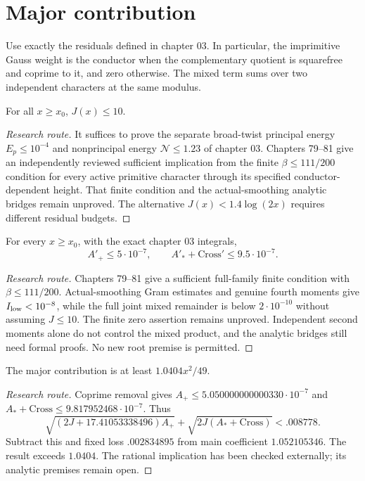 \chapter{Major contribution}
Use exactly the residuals defined in chapter 03. In particular, the
imprimitive Gauss weight is the conductor when the complementary quotient
is squarefree and coprime to it, and zero otherwise. The mixed term sums
over two independent characters at the same modulus.

\begin{theorem}\label{upperj}\notready
For all $x\ge x_0$, $J(x)\le10$.
\end{theorem}
\begin{proof}[Research route]
It suffices to prove the separate broad-twist principal energy
$E_p\le10^{-4}$ and nonprincipal energy $\mathcal N\le1.23$ of chapter 03.
Chapters 79--81 give an independently reviewed sufficient implication
from the finite $\beta\le111/200$ condition for every active primitive
character through its specified conductor-dependent height. That finite
condition and the actual-smoothing analytic bridges remain unproved.
The alternative $J(x)<1.4\log(2x)$ requires different residual budgets.
\end{proof}

\begin{theorem}\label{residual}\notready
For every $x\ge x_0$, with the exact chapter 03 integrals,
\[A'_+\le5\cdot10^{-7},\qquad A'_*+\mathrm{Cross}'\le9.5\cdot10^{-7}.\]
\end{theorem}
\begin{proof}[Research route]
Chapters 79--81 give a sufficient full-family finite condition with
$\beta\le111/200$. Actual-smoothing Gram estimates and genuine fourth
moments give $I_{\rm low}<10^{-8}$, while the full joint mixed remainder
is below $2\cdot10^{-10}$ without assuming $J\le10$.
The finite zero assertion remains unproved. Independent second moments
alone do not control the mixed product, and the analytic bridges still
need formal proofs. No new root premise is permitted.
\end{proof}

\begin{theorem}\label{major}\notready
The major contribution is at least $1.0404x^2/49$.
\end{theorem}
\begin{proof}[Research route]
Coprime removal gives $A_+\le5.050000000000330\cdot10^{-7}$ and
$A_*+\mathrm{Cross}\le9.817952468\cdot10^{-7}$. Thus
\[\sqrt{(2J+17.41053338496)A_+}+
\sqrt{2J(A_*+\mathrm{Cross})}<.008778.\]
Subtract this and fixed loss $.002834895$ from main coefficient
$1.052105346$. The result exceeds $1.0404$. The rational implication has
been checked externally; its analytic premises remain open.
\end{proof}

